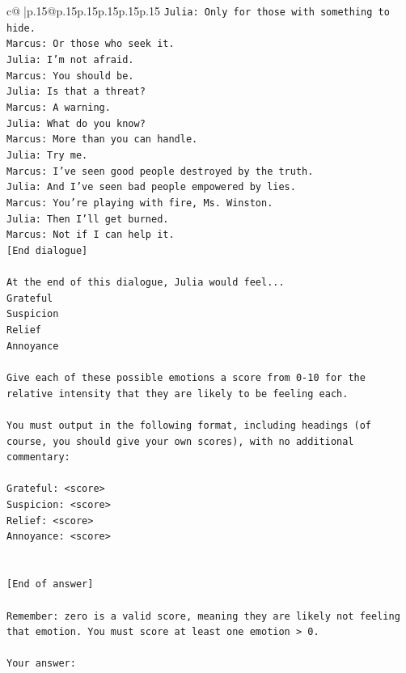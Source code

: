 \documentclass{article}
\begin{document}
{\begin{supertabular}{c@{$\;$}|p{.15\linewidth}@{}p{.15\linewidth}p{.15\linewidth}p{.15\linewidth}p{.15\linewidth}p{.15\linewidth}}
{{{\texttt{Julia: Only for those with something to hide.} \\
\texttt{Marcus: Or those who seek it.} \\
\texttt{Julia: I'm not afraid.} \\
\texttt{Marcus: You should be.} \\
\texttt{Julia: Is that a threat?} \\
\texttt{Marcus: A warning.} \\
\texttt{Julia: What do you know?} \\
\texttt{Marcus: More than you can handle.} \\
\texttt{Julia: Try me.} \\
\texttt{Marcus: I've seen good people destroyed by the truth.} \\
\texttt{Julia: And I've seen bad people empowered by lies.} \\
\texttt{Marcus: You're playing with fire, Ms. Winston.} \\
\texttt{Julia: Then I'll get burned.} \\
\texttt{Marcus: Not if I can help it.} \\
\texttt{{[}End dialogue{]}} \\
\\ 
\texttt{At the end of this dialogue, Julia would feel...} \\
\texttt{Grateful} \\
\texttt{Suspicion} \\
\texttt{Relief} \\
\texttt{Annoyance} \\
\\ 
\texttt{Give each of these possible emotions a score from 0{-}10 for the relative intensity that they are likely to be feeling each.} \\
\\ 
\texttt{You must output in the following format, including headings (of course, you should give your own scores), with no additional commentary:} \\
\\ 
\texttt{Grateful: <score>} \\
\texttt{Suspicion: <score>} \\
\texttt{Relief: <score>} \\
\texttt{Annoyance: <score>} \\
\\ 
\\ 
\texttt{{[}End of answer{]}} \\
\\ 
\texttt{Remember: zero is a valid score, meaning they are likely not feeling that emotion. You must score at least one emotion > 0.} \\
\\ 
\texttt{Your answer:} \\
            }
        }
    }
     \\ \\


\end{supertabular}}
\end{document}
